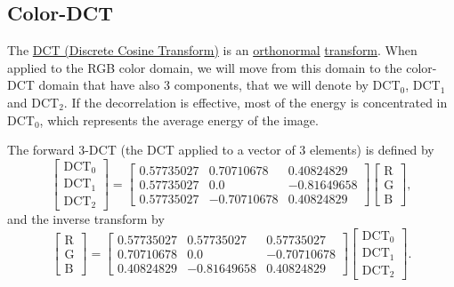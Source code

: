 \subsection{Color-DCT}

The \href{https://en.wikipedia.org/wiki/Discrete_cosine_transform}{DCT
  (Discrete Cosine Transform)} is an
\href{https://en.wikipedia.org/wiki/Orthonormality}{orthonormal}
\href{https://vicente-gonzalez-ruiz.github.io/transform_coding/}{transform}. When
applied to the RGB color domain, we will move from this domain to the
color-DCT domain that have also 3 components, that we will denote by
DCT$_0$, DCT$_1$ and DCT$_2$. If the decorrelation is effective, most
of the energy is concentrated in DCT$_0$, which represents the
average energy of the image.

The forward $3$-DCT (the DCT applied to a vector of $3$ elements) is
defined by
\begin{equation}
  \begin{bmatrix}
    \text{DCT}_0 \\
    \text{DCT}_1 \\
    \text{DCT}_2
  \end{bmatrix}
  =
  \begin{bmatrix}
    0.57735027 & 0.70710678 & 0.40824829 \\
    0.57735027 & 0.0 & -0.81649658 \\
    0.57735027 & -0.70710678 & 0.40824829
  \end{bmatrix}
  \begin{bmatrix}
    \text{R} \\
    \text{G} \\
    \text{B}
  \end{bmatrix},
\end{equation}
and the inverse transform by
\begin{equation}
  \begin{bmatrix}
    \text{R} \\
    \text{G} \\
    \text{B}
  \end{bmatrix}
  =
  \begin{bmatrix}
    0.57735027 & 0.57735027 & 0.57735027 \\
    0.70710678 & 0.0 & -0.70710678 \\
    0.40824829 & -0.81649658 & 0.40824829
  \end{bmatrix}
  \begin{bmatrix}
    \text{DCT}_0 \\
    \text{DCT}_1 \\
    \text{DCT}_2
  \end{bmatrix}.
\end{equation}
